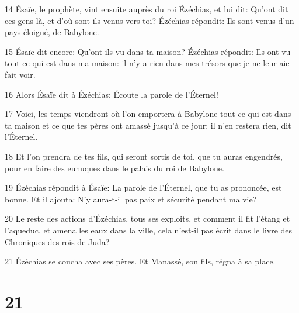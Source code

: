 \par 14 Ésaïe, le prophète, vint ensuite auprès du roi Ézéchias, et lui dit: Qu'ont dit ces gens-là, et d'où sont-ils venus vers toi? Ézéchias répondit: Ils sont venus d'un pays éloigné, de Babylone.
\par 15 Ésaïe dit encore: Qu'ont-ils vu dans ta maison? Ézéchias répondit: Ils ont vu tout ce qui est dans ma maison: il n'y a rien dans mes trésors que je ne leur aie fait voir.
\par 16 Alors Ésaïe dit à Ézéchias: Écoute la parole de l'Éternel!
\par 17 Voici, les temps viendront où l'on emportera à Babylone tout ce qui est dans ta maison et ce que tes pères ont amassé jusqu'à ce jour; il n'en restera rien, dit l'Éternel.
\par 18 Et l'on prendra de tes fils, qui seront sortis de toi, que tu auras engendrés, pour en faire des eunuques dans le palais du roi de Babylone.
\par 19 Ézéchias répondit à Ésaïe: La parole de l'Éternel, que tu as prononcée, est bonne. Et il ajouta: N'y aura-t-il pas paix et sécurité pendant ma vie?
\par 20 Le reste des actions d'Ézéchias, tous ses exploits, et comment il fit l'étang et l'aqueduc, et amena les eaux dans la ville, cela n'est-il pas écrit dans le livre des Chroniques des rois de Juda?
\par 21 Ézéchias se coucha avec ses pères. Et Manassé, son fils, régna à sa place.

\chapter{21}

